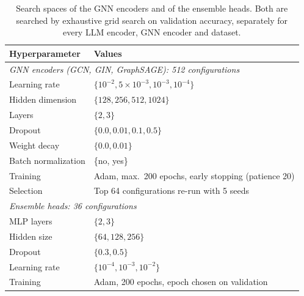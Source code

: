 \documentclass[a4paper,fleqn]{cas-sc}
\begin{document}
\begin{table}[htbp]
\centering\color{red}
\caption{Search spaces of the GNN encoders and of the ensemble heads. Both are searched by exhaustive grid search on validation accuracy, separately for every LLM encoder, GNN encoder and dataset.}
\label{tab:search_space}
\small
\begin{tabular*}{\columnwidth}{@{\extracolsep{\fill}} ll @{}}
\toprule
\textbf{Hyperparameter} & \textbf{Values} \\
\midrule
\multicolumn{2}{l}{\textit{GNN encoders (GCN, GIN, GraphSAGE): 512 configurations}} \\
\midrule
Learning rate & $\{10^{-2}, 5\times10^{-3}, 10^{-3}, 10^{-4}\}$ \\
Hidden dimension & $\{128, 256, 512, 1024\}$ \\
Layers & $\{2, 3\}$ \\
Dropout & $\{0.0, 0.01, 0.1, 0.5\}$ \\
Weight decay & $\{0.0, 0.01\}$ \\
Batch normalization & \{no, yes\} \\
Training & Adam, max.\ 200 epochs, early stopping (patience 20) \\
Selection & Top 64 configurations re-run with 5 seeds \\
\midrule
\multicolumn{2}{l}{\textit{Ensemble heads: 36 configurations}} \\
\midrule
MLP layers & $\{2, 3\}$ \\
Hidden size & $\{64, 128, 256\}$ \\
Dropout & $\{0.3, 0.5\}$ \\
Learning rate & $\{10^{-4}, 10^{-3}, 10^{-2}\}$ \\
Training & Adam, 200 epochs, epoch chosen on validation \\
\bottomrule
\end{tabular*}
\end{table}
\end{document}

